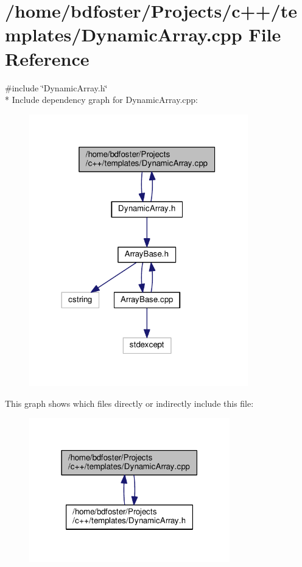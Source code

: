 \hypertarget{a00005}{\section{/home/bdfoster/\+Projects/c++/templates/\+Dynamic\+Array.cpp File Reference}
\label{a00005}
}
{\ttfamily \#include \char`\"{}Dynamic\+Array.\+h\char`\"{}}\\*
Include dependency graph for Dynamic\+Array.\+cpp\+:
\nopagebreak
\begin{figure}[H]
\begin{center}
\leavevmode
\includegraphics[width=269pt]{da/d45/a00011}
\end{center}
\end{figure}
This graph shows which files directly or indirectly include this file\+:
\nopagebreak
\begin{figure}[H]
\begin{center}
\leavevmode
\includegraphics[width=247pt]{df/d86/a00012}
\end{center}
\end{figure}
